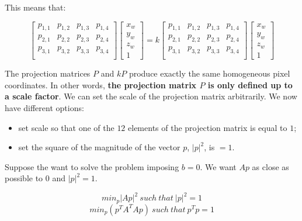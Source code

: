 \documentclass{article}
\begin{document}
\newpage

This means that:

\begin{equation*}
    \begin{bmatrix}
        p_{1, 1} & p_{1, 2} & p_{1, 3} & 
        p_{1, 4} \\
        p_{2, 1} & p_{2, 2} & p_{2, 3} & 
        p_{2, 4} \\
        p_{3, 1} & p_{3, 2} & p_{3, 3} & 
        p_{3, 4} \\
    \end{bmatrix}
    \begin{bmatrix}
        x_w \\ y_w \\ z_w \\ 1
    \end{bmatrix} = k
    \begin{bmatrix}
        p_{1, 1} & p_{1, 2} & p_{1, 3} & 
        p_{1, 4} \\
        p_{2, 1} & p_{2, 2} & p_{2, 3} & 
        p_{2, 4} \\
        p_{3, 1} & p_{3, 2} & p_{3, 3} & 
        p_{3, 4} \\
    \end{bmatrix}
    \begin{bmatrix}
        x_w \\ y_w \\ z_w \\ 1
    \end{bmatrix}
\end{equation*}

The projection matrices $P$ and $kP$ produce exactly the same homogeneous pixel coordinates. In other words, \textbf{the projection matrix $P$ is only defined up to a scale factor}. We can set the scale of the projection matrix arbitrarily. We now have different options:

\begin{itemize}
    \item set scale so that one of the $12$ elements of the projection matrix is equal to $1$;
    \item set the square of the magnitude of the vector $p$, $|p|^2$, is $=1$.
\end{itemize}

Suppose the want to solve the problem imposing $b = 0$. We want $Ap$ as close as possible to $0$ and $|p|^2 = 1$.

\begin{equation*}
    min_p |Ap|^2\ such\ that\ |p|^2 = 1
\end{equation*}
\begin{equation*}
    min_p(p^TA^TAp)\ such\ that\ p^Tp = 1
\end{equation*}
\end{document}
